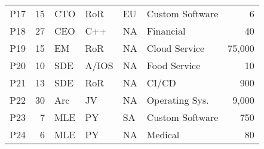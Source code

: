 \begin{table}[]
\begin{tabular}{lrlll|lr}
P17 & 15 & CTO & RoR & EU & Custom Software & 6 \\ 
P18 & 27 & CEO & C++ & NA & Financial & 40 \\ 
P19 & 15 & EM & RoR & NA & Cloud Service & 75,000 \\ 
P20 & 10 & SDE & A/IOS & NA & Food Service & 10 \\ 
P21 & 13 & SDE & RoR & NA & CI/CD & 900  \\ 
P22 & 30 & Arc & JV & NA & Operating Sys. & 9,000 \\ 
P23 & 7 & MLE & PY & SA & Custom Software & 750 \\ 
P24 & 6 & MLE & PY & NA & Medical & 80 \\ 

    \bottomrule
    \end{tabular}

    \label{tab:interviewee-profile}
\end{table}
